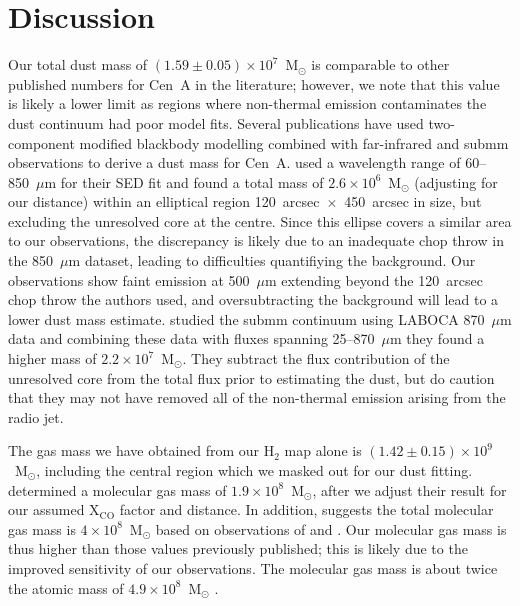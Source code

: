 \section{Discussion}\label{sec:discuss}
Our total dust mass of $(1.59 \pm 0.05) \times 10^{7}$~M$_{\odot}$ is comparable to other published numbers for Cen~A in the literature; however, we note that this value is likely a lower limit as regions where non-thermal emission contaminates the dust continuum had poor model fits.  Several publications have used two-component modified blackbody modelling combined with far-infrared and submm observations to derive a dust mass for Cen~A.  \citet{2002ApJ...565..131L} used a wavelength range of 60--850~$\mu$m for their SED fit and found a total mass of $2.6 \times 10^{6}$~M$_{\odot}$ (adjusting for our distance) within an elliptical region 120~arcsec~$\times$~450~arcsec in size, but excluding the unresolved core at the centre.  Since this ellipse covers a similar area to our observations, the discrepancy is likely due to an inadequate chop throw in the \citet{2002ApJ...565..131L} 850~$\mu$m dataset, leading to difficulties quantifiying the background.  Our observations show faint emission at 500~$\mu$m extending beyond the 120~arcsec chop throw the authors used, and oversubtracting the background will lead to a lower dust mass estimate.  \citet{2008A&A...490...77W} studied the submm continuum using LABOCA 870~$\mu$m data and combining these data with fluxes spanning 25--870~$\mu$m they found a higher mass of $2.2 \times 10^{7}$~M$_{\odot}$.  They subtract the flux contribution of the unresolved core from the total flux prior to estimating the dust, but do caution that they may not have removed all of the non-thermal emission arising from the radio jet.

The gas mass we have obtained from our H$_{2}$ map alone is $(1.42 \pm 0.15) \times 10^{9}$~M$_{\odot}$, including the central region which we masked out for our dust fitting.  \citet{1990ApJ...363..451E} determined a molecular gas mass of $1.9 \times 10^{8}$~M$_{\odot}$, after we adjust their result for our assumed X$_{\mathrm{CO}}$ factor and distance.  In addition, \citet{2010PASA...27..463M} suggests the total molecular gas mass is $4 \times 10^{8}$~M$_{\odot}$ based on observations of \citet{1990ApJ...363..451E} and \citet{1992ApJ...391..121Q}.  Our molecular gas mass is thus higher than those values previously published; this is likely due to the improved sensitivity of our observations.  The molecular gas mass is about twice the atomic mass of $4.9 \times 10^{8}$~M$_{\odot}$ \citep{2010A&A...515A..67S}.

